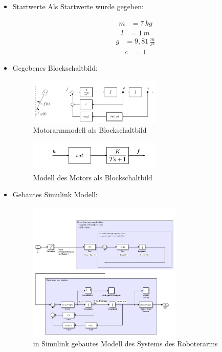 \documentclass[11pt]{scrartcl}
\begin{document}
\begin{itemize}
\item Startwerte
Als Startwerte wurde gegeben:

\begin{align}
   	m &= 7\, kg
\end{align}
\begin{align}
   	l &= 1\, m
\end{align}
\begin{align}
   	g &= 9,81\, \frac{m}{s^2}
\end{align}
\begin{align}
   	c &= 1
\end{align}

	
	


\item Gegebenes Blockschaltbild:
\begin{figure}[H]
	\centering
	\includegraphics[width=0.6\textwidth]{Aufgabe9aMotorarm.png}
	\caption{Motorarmmodell als Blockschaltbild}
	\label{img:grafik-dummy}
\end{figure}
\begin{figure}[H]
	\centering
	\includegraphics[width=0.6\textwidth]{Aufgabe9aStreckeMotor.png}
	\caption{Modell des Motors als Blockschaltbild}
	\label{img:grafik-dummy}
\end{figure}
\item Gebautes Simulink Modell:
\begin{figure}[H]
	\centering
	\includegraphics[width=0.7\textwidth]{SimulinkModell.jpeg}
	\caption{in Simulink gebautes Modell des Systems des Roboterarms}
	\label{img:grafik-dummy}
\end{figure}
\end{itemize}
\end{document}
